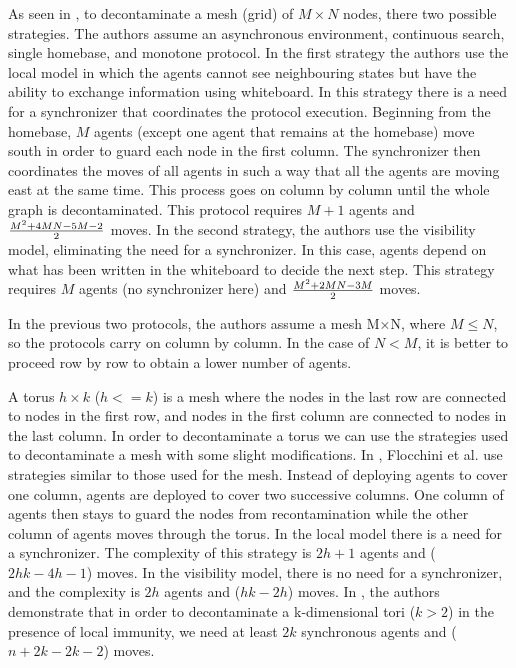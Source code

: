 As seen in \cite{floetal19}, to decontaminate a mesh (grid) of $M\times N$ nodes, there two possible strategies. The authors assume an asynchronous environment, continuous search, single homebase, and monotone protocol. In the first strategy the authors use the local model in which the agents cannot see neighbouring states but have the ability to exchange information using whiteboard. In this strategy there is a need for a synchronizer that coordinates the protocol execution. Beginning from the homebase, $M$ agents (except one agent that remains at the homebase) move south in order to guard each node in the first column. The synchronizer then coordinates the moves of all agents in such a way that all the agents are moving east at the same time.  This process goes on column by column until the whole graph is decontaminated. This protocol requires $M+1$ agents and ${M^2+4MN-5M-2}\over 2$ moves. In the second strategy, the authors use the visibility model, eliminating the need for a synchronizer. In this case, agents depend on what has been written in the whiteboard to decide the next step. This strategy requires $M$ agents (no synchronizer here) and ${M^2+2MN-3M}\over 2$ moves.

In the previous two protocols, the authors assume a mesh M×N, where $M\leq N$, so the protocols carry on column by column. In the case of  $N < M$, it is better to proceed row by row to obtain a lower number of agents.

A torus $h\times k$ ($h<=k$) is a mesh where the nodes in the last row are connected to nodes in the first row, and nodes in the first column are connected to nodes in the last column. In order to decontaminate a torus we can use the strategies used to decontaminate a mesh with some slight modifications.  In \cite{floetal17}, Flocchini et al. use strategies similar to those used for the mesh. Instead of deploying agents to cover one column, agents are deployed to cover two successive columns. One column of agents then stays to guard the nodes from recontamination while the other column of agents moves through the torus. In the local model there is a need for a synchronizer. The complexity of this strategy is $2h+1$ agents and ($2hk-4h-1$) moves. In the visibility model, there is no need for a synchronizer, and the complexity is $2h$ agents and ($hk-2h$) moves. In \cite{lucetal22}, the authors demonstrate that in order to decontaminate a  k-dimensional tori ($k>2$) in the presence of local immunity, we need at least $2k$ synchronous agents and ($n+2k-2k-2$) moves.

